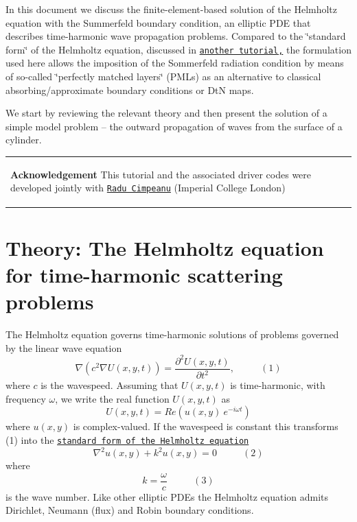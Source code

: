 In this document we discuss the finite-\/element-\/based solution of the Helmholtz equation with the Summerfeld boundary condition, an elliptic P\+DE that describes time-\/harmonic wave propagation problems. Compared to the \char`\"{}standard form\char`\"{} of the Helmholtz equation, discussed in \href{../../../helmholtz/scattering/html/index.html}{\tt another tutorial,} the formulation used here allows the imposition of the Sommerfeld radiation condition by means of so-\/called \char`\"{}perfectly matched layers\char`\"{} (P\+M\+Ls) as an alternative to classical absorbing/approximate boundary conditions or DtN maps.

We start by reviewing the relevant theory and then present the solution of a simple model problem -- the outward propagation of waves from the surface of a cylinder. \begin{center} \tabulinesep=1mm
\begin{longtabu} spread 0pt [c]{*{1}{|X[-1]}|}
\hline
\begin{center}  {\bfseries Acknowledgement} This tutorial and the associated driver codes were developed jointly with \href{http://imperial.academia.edu/RaduCimpeanu}{\tt Radu Cimpeanu} (Imperial College London)  \end{center}    \\
\end{longtabu}
\end{center} \hypertarget{index_theory}{}\section{Theory\+: The Helmholtz equation for time-\/harmonic scattering problems}\label{index_theory}
The Helmholtz equation governs time-\/harmonic solutions of problems governed by the linear wave equation \[ \nabla( c^2 \nabla U(x,y,t)) = \frac{\partial^2 U(x,y,t)}{\partial t^2}, \ \ \ \ \ \ \ \ \ \ \ \ (1) \] where $ c $ is the wavespeed. Assuming that $ U(x,y,t) $ is time-\/harmonic, with frequency $ \omega $, we write the real function $ U(x,y,t) $ as \[ U(x,y,t) =Re (u(x,y) \ e^{-i \omega t}) \] where $ u(x,y) $ is complex-\/valued. If the wavespeed is constant this transforms (1) into the \href{../../../helmholtz/scattering/html/index.html}{\tt standard form of the Helmholtz equation} \[ \nabla^2 u(x,y) + k^2 u(x,y) = 0 \ \ \ \ \ \ \ \ \ \ \ \ (2) \] where \[ k = \frac{\omega}{c} \ \ \ \ \ \ \ \ \ \ \ \ (3) \] is the wave number. Like other elliptic P\+D\+Es the Helmholtz equation admits Dirichlet, Neumann (flux) and Robin boundary conditions.

